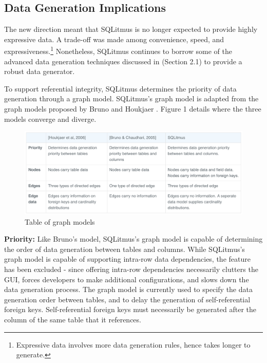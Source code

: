 \documentclass[12pt]{report}
\begin{document}
\begin{spacing}{1.9}
		
		
		\subsection{Data Generation Implications}
		The new direction meant that SQLitmus is no longer expected to provide highly expressive data. A trade-off was made among convenience, speed, and expressiveness.\footnote{Expressive data involves more data generation rules, hence takes longer to generate.} Nonetheless, SQLitmus continues to borrow some of the advanced data generation techniques discussed in (Section 2.1) to provide a robust data generator.
		
		To support referential integrity, SQLitmus determines the priority of data generation through a graph model. SQLitmus's graph model is adapted from the graph models proposed by Bruno \cite{Bruno:2005} and Houkjaer \cite{Houkjaer:2006}. Figure 1 details where the three models converge and diverge.
		
		\begin{figure}[H]
			\centering
			\includegraphics[width=\textwidth]{2-3-1.png}
			\caption{Table of graph models}
			
		\end{figure}
		
		
		\textbf{Priority:} Like Bruno’s\cite{Bruno:2005} model, SQLitmus’s graph model is capable of determining the order of data generation between tables and columns. While SQLitmus’s graph model is capable of supporting intra-row data dependencies, the feature has been excluded - since offering intra-row dependencies necessarily clutters the GUI, forces developers to make additional configurations, and slows down the data generation process. The graph model is currently used to specify the data generation order between tables, and to delay the generation of self-referential foreign keys. Self-referential foreign keys must necessarily be generated after the column of the same table that it references.
		

\end{spacing}
\end{document}
